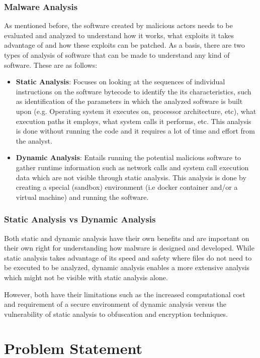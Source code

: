 \subsubsection{Malware Analysis}
As mentioned before, the software created by malicious actors needs to be evaluated and analyzed to
understand how it works, what exploits it takes advantage of and how these exploits can be patched.
As a basis, there are two types of analysis of software that can be made to understand any kind of
software. These are as follows:
\begin{itemize}
	\item \textbf{Static Analysis}: Focuses on looking at the sequences of individual instructions on the software
	      bytecode to identify the its characteristics, such as identification of the parameters in which the
	      analyzed software is built upon (e.g. Operating system it executes on, processor architecture,
	      etc), what execution paths it employs, what system calls it performs, etc. This analysis is done
	      without running the code and it requires a lot of time and effort from the analyst.
	\item \textbf{Dynamic Analysis}: Entails running the potential malicious software to gather runtime information
	      such as network calls and system call execution data which are not visible through static analysis.
	      This analysis is done by creating a special (sandbox) environment (i.e docker container and/or a virtual
	      machine) and running the software.
\end{itemize}

\subsubsection{Static Analysis vs Dynamic Analysis}
Both static and dynamic analysis have their own benefits and are important on their own right for
understanding how malware is designed and developed. While static analysis takes advantage of its
speed and safety where files do not need to be executed to be analyzed, dynamic analysis enables a
more extensive analysis which might not be visible with static analysis alone.

However, both have their limitations such as the increased computational cost and requirement of a
secure environment of dynamic analysis versus the vulnerability of static analysis to obfuscation
and encryption techniques.

\section{Problem Statement}

